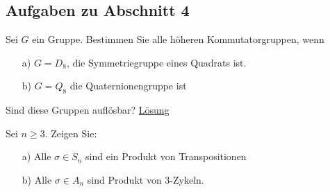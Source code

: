 \subsection{Aufgaben zu Abschnitt 4}

\begin{exe}\label{aufgabe:4.1} 
	Sei $ G $ ein Gruppe.
	Bestimmen Sie alle höheren Kommutatorgruppen, wenn
	\begin{enumerate}
		\item[a)]
		$ G = D_8  $, die Symmetriegruppe eines Quadrats ist.
		
		\item[b)]
		$ G = Q_8 $ die Quaternionengruppe ist 
	\end{enumerate}
	Sind diese Gruppen auflösbar?
	\hyperlink{loes:4.1}{Lösung}
\end{exe}



\begin{exe}
	Sei $ n \geq 3 $. Zeigen Sie:
	\begin{enumerate}
		\item[a)]
		Alle $ \sigma \in S_n $ sind ein Produkt von Transpositionen
		\item[b)] 
		Alle $ \sigma \in A_n $ sind Produkt von 3-Zykeln. 
	\end{enumerate}
\end{exe}

